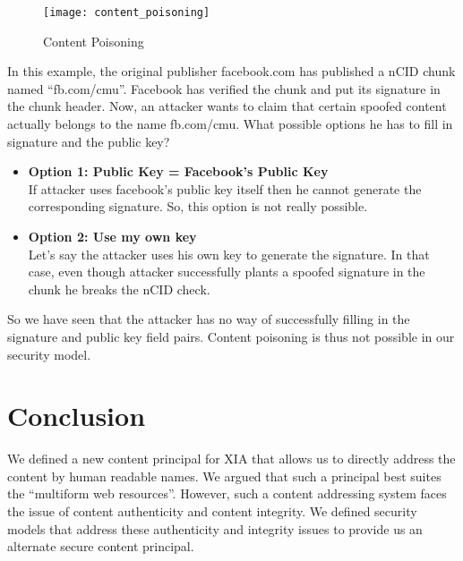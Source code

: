 \begin{figure}
  \begin{center}
    \texttt{[image: content\_poisoning]}
  \caption{Content Poisoning}
  \label{fig:content_poisoning}
  \end{center}
\end{figure}

In this example, the original publisher facebook.com has published a
nCID chunk named ``fb.com/cmu''. Facebook has verified the chunk and
put its signature in the chunk header. Now, an attacker wants to claim
that certain spoofed content actually belongs to the name
fb.com/cmu. What possible options he has to fill in signature and the
public key?

\begin{itemize}

\item{\textbf{Option 1: Public Key = Facebook’s Public Key}} \\
If attacker uses facebook’s public key itself then he cannot generate
the corresponding signature. So, this option is not really possible.

\item{\textbf{Option 2: Use my own key}}\\
Let’s say the attacker uses his own key to generate the signature. In
that case, even though attacker successfully plants a spoofed
signature in the chunk he breaks the nCID check.

\end{itemize}

So we have seen that the attacker has no way of successfully filling
in the signature and public key field pairs. Content poisoning is thus
not possible in our security model.

\section{Conclusion}
We defined a new content principal for XIA that allows us to directly
address the content by human readable names. We argued that such a
principal best suites the ``multiform web resources''. However, such a
content addressing system faces the issue of content authenticity and
content integrity. We defined security models that address these
authenticity and integrity issues to provide us an alternate secure
content principal.

